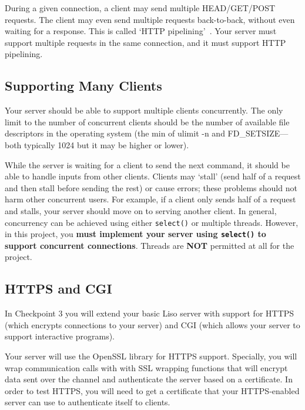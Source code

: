 \vspace{5pt}

 During a given connection, a client may send multiple HEAD/GET/POST requests.
The client may even send multiple requests back-to-back, without even waiting for a response.
This is called `HTTP pipelining'~\cite{pipelining}. Your server must support multiple requests in the same connection, and it must support HTTP pipelining.

\subsection{Supporting Many Clients}
Your server should be able to support multiple clients concurrently. The only
limit to the number of concurrent clients should be the number of available
file descriptors in the operating system (the min of ulimit -n and
FD\_SETSIZE---both typically 1024 but it may be higher or lower).  


While the server is waiting for a client to
send the next command, it should be able to handle inputs from other clients.
Clients may `stall' (send half of a request and then stall before sending the rest) or cause errors; these problems should not harm other concurrent users.
For example, if a client only sends half of a request and stalls, your server should move on to serving another client.
In general, concurrency can be achieved using either \texttt{select()} or
multiple threads. However, in this project, you \textbf{must implement your
server using \texttt{select()} to support concurrent connections}. Threads are
\textbf{NOT} permitted at all for the project. 

\subsection{HTTPS and CGI}
In Checkpoint 3 you will extend your basic Liso server with support for HTTPS (which encrypts connections to your server) and CGI (which allows your server to support interactive programs).  

\vspace{5pt}

Your server will use the OpenSSL library for HTTPS support.  Specially, you will wrap communication calls with with SSL wrapping functions that will encrypt data sent over the channel and authenticate the server based on a certificate.  
In order to test HTTPS, you will need to get a certificate that your HTTPS-enabled server can use to authenticate itself to clients.  

